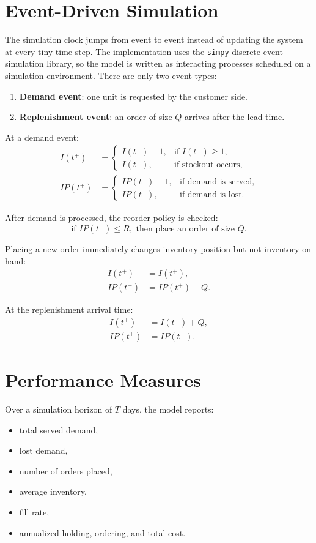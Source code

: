 \documentclass[11pt]{article}
\begin{document}
\section{Event-Driven Simulation}
The simulation clock jumps from event to event instead of updating the system at every tiny time step. The implementation uses the \texttt{simpy} discrete-event simulation library, so the model is written as interacting processes scheduled on a simulation environment. There are only two event types:
\begin{enumerate}
  \item \textbf{Demand event}: one unit is requested by the customer side.
  \item \textbf{Replenishment event}: an order of size $Q$ arrives after the lead time.
\end{enumerate}

At a demand event:
\begin{align}
I(t^+) &=
\begin{cases}
I(t^-) - 1, & \text{if } I(t^-) \ge 1, \\
I(t^-), & \text{if stockout occurs,}
\end{cases} \\
IP(t^+) &=
\begin{cases}
IP(t^-) - 1, & \text{if demand is served,} \\
IP(t^-), & \text{if demand is lost.}
\end{cases}
\end{align}

After demand is processed, the reorder policy is checked:
\begin{equation}
\text{if } IP(t^+) \le R, \text{ then place an order of size } Q.
\end{equation}

Placing a new order immediately changes inventory position but not inventory on hand:
\begin{align}
I(t^+) &= I(t^+), \\
IP(t^+) &= IP(t^+) + Q.
\end{align}

At the replenishment arrival time:
\begin{align}
I(t^+) &= I(t^-) + Q, \\
IP(t^+) &= IP(t^-).
\end{align}

\section{Performance Measures}
Over a simulation horizon of $T$ days, the model reports:
\begin{itemize}
  \item total served demand,
  \item lost demand,
  \item number of orders placed,
  \item average inventory,
  \item fill rate,
  \item annualized holding, ordering, and total cost.
\end{itemize}
\end{document}
